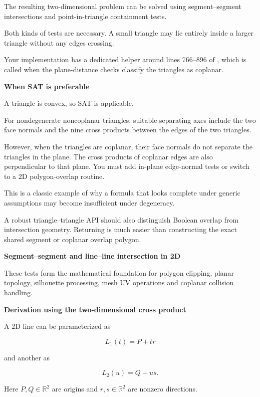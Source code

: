 The resulting two-dimensional problem can be solved using segment--segment intersections and point-in-triangle containment tests.

Both kinds of tests are necessary. A small triangle may lie entirely inside a larger triangle without any edges crossing.

Your implementation has a dedicated  helper around lines 766--896 of , which is called when the plane-distance checks classify the triangles as coplanar.

\textbf{When SAT is preferable}

A triangle is convex, so SAT is applicable.

For nondegenerate noncoplanar triangles, suitable separating axes include the two face normals and the nine cross products between the edges of the two triangles.

However, when the triangles are coplanar, their face normals do not separate the triangles in the plane. The cross products of coplanar edges are also perpendicular to that plane. You must add in-plane edge-normal tests or switch to a 2D polygon-overlap routine.

This is a classic example of why a formula that looks complete under generic assumptions may become insufficient under degeneracy.

A robust triangle--triangle API should also distinguish Boolean overlap from intersection geometry. Returning  is much easier than constructing the exact shared segment or coplanar overlap polygon.

\textbf{Segment--segment and line--line intersection in 2D}

These tests form the mathematical foundation for polygon clipping, planar topology, silhouette processing, mesh UV operations and coplanar collision handling.

\textbf{Derivation using the two-dimensional cross product}

A 2D line can be parameterized as

\[
L_1(t)=P+tr
\]

and another as

\[
L_2(u)=Q+us.
\]

Here \(P,Q\in\mathbb R^2\) are origins and \(r,s\in\mathbb R^2\) are nonzero directions.

